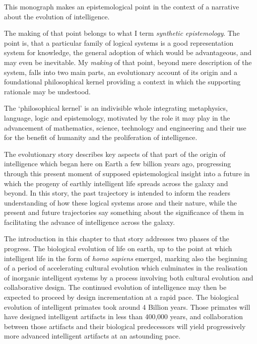 
This monograph makes an epistemological point in the context of a narrative about the evolution of intelligence.

The making of that point belongs to what I term \emph{synthetic epistemology}.
The point is, that a particular family of logical systems is a good representation system for knowledge, the general adoption of which would be advantageous, and may even be inevitable.
My \emph{making} of that point, beyond mere description of the system, falls into two main parts, an evolutionary account of its origin and a foundational philosophical kernel providing a context in which the supporting rationale may be undestood.

The `philosophical kernel' is an indivisible whole integrating metaphysics, language, logic and epistemology, motivated by the role it may play in the advancement of mathematics, science, technology and engineering and their use for the benefit of humanity and the proliferation of intelligence.

The evolutionary story describes key aspects of that part of the origin of intelligence which began here on Earth a few billion years ago, progressing through this present moment of supposed epistemological insight into a future in which the progeny of earthly intelligent life spreads across the galaxy and beyond.
In this story, the past trajectory is intended to inform the readers understanding of how these logical systems arose and their nature, while the present and future trajectories say something about the significance of them in facilitating the advance of intelligence across the galaxy.








The introduction in this chapter to that story addresses two phases of the progress.
The biological evolution of life on earth, up to the point at which intelligent life in the form of \emph{homo sapiens} emerged, marking also the beginning of a period of accelerating cultural evolution which culminates in the realisation of inorganic intelligent systems by a process involving both cultural evolution and collaborative design.
The continued evolution of intelligence may then be expected to proceed by design incrementation at a rapid pace.
The biological evolution of intelligent primates took around 4 Billion years.
Those primates will have designed intelligent artifacts in less than 400,000 years, and collaboration between those artifacts and their biological predecessors will yield progressively more advanced intelligent artifacts at an astounding pace.

